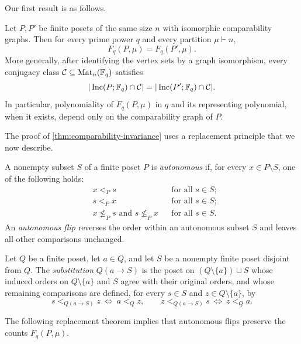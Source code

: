 {Our first result is as follows.}

\begin{theorem}
\label{thm:comparability-invariance}\label{cor:reorientation}
Let $P,P'$ be finite posets of the same size $n$ with isomorphic
comparability graphs. { Then for every prime power $q$ and every
{partition $\mu\vdash n$},}
\begin{equation}
 F_q(P,\mu)=F_q(P',\mu).
 \label{eq:comparability-invariance}
\end{equation}
More generally, after identifying the vertex sets by a graph isomorphism,
every {conjugacy class} $\mathcal C\subseteq\operatorname{Mat}_n(\mathbb F_q)$ satisfies
\begin{equation}
 |\operatorname{Inc}(P;\mathbb F_q)\cap\mathcal C|=|\operatorname{Inc}(P';\mathbb F_q)\cap\mathcal C|.
 \label{eq:full-comparability}
\end{equation}
{In particular, polynomiality of $F_q(P,\mu)$ in $q$
and its representing polynomial, when it exists, depend only on the
comparability graph of $P$.}
\end{theorem}

{The proof of \cref{thm:comparability-invariance}
uses a replacement principle that we now describe.}
\begin{definition}
\label{def:autonomous-subsets}
{A nonempty subset $S$ of a finite poset $P$ is
\emph{autonomous} if, for every $x\in P\setminus S$, one of the following
holds:
\[
\begin{aligned}
 &x<_P s &&\text{for all }s\in S;\\
 &s<_P x &&\text{for all }s\in S;\\
 &x\nleq_P s\text{ and }s\nleq_P x &&\text{for all }s\in S.
\end{aligned}
\]
}
{An \emph{autonomous flip} reverses the order within
an autonomous subset $S$ and leaves all other comparisons unchanged.}

{Let $Q$ be a finite poset, let $a\in Q$, and let
$S$ be a nonempty finite poset disjoint from $Q$. The \emph{substitution}
$Q(a\to S)$ is the poset on $(Q\setminus\{a\})\sqcup S$ whose induced
orders on $Q\setminus\{a\}$ and $S$ agree with their original orders,
and whose remaining comparisons are defined, for every $s\in S$ and
$z\in Q\setminus\{a\}$, by
\[
 s<_{Q(a\to S)}z\ \Longleftrightarrow\ a<_Q z,
 \qquad
 z<_{Q(a\to S)}s\ \Longleftrightarrow\ z<_Q a.
\]
}
\end{definition}

{The following replacement theorem implies that autonomous flips preserve the
counts $F_q(P,\mu)$.}

